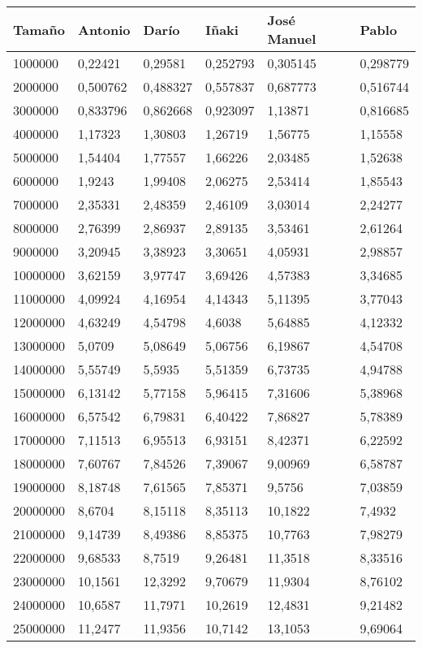 \begin{tabular}{|l|l|l|l|l|l|}
	\hline
	Tamaño & Antonio & Darío & Iñaki & José Manuel & Pablo \\
	\hline
	\hline
	1000000 & 0,22421 & 0,29581 & 0,252793 & 0,305145 & 0,298779 \\
	\hline
	2000000 & 0,500762 & 0,488327 & 0,557837 & 0,687773 & 0,516744 \\
	\hline
	3000000 & 0,833796 & 0,862668 & 0,923097 & 1,13871 & 0,816685 \\
	\hline
	4000000 & 1,17323 & 1,30803 & 1,26719 & 1,56775 & 1,15558 \\
	\hline
	5000000 & 1,54404 & 1,77557 & 1,66226 & 2,03485 & 1,52638 \\
	\hline
	6000000 & 1,9243 & 1,99408 & 2,06275 & 2,53414 & 1,85543 \\
	\hline
	7000000 & 2,35331 & 2,48359 & 2,46109 & 3,03014 & 2,24277 \\
	\hline
	8000000 & 2,76399 & 2,86937 & 2,89135 & 3,53461 & 2,61264 \\
	\hline
	9000000 & 3,20945 & 3,38923 & 3,30651 & 4,05931 & 2,98857 \\
	\hline
	10000000 & 3,62159 & 3,97747 & 3,69426 & 4,57383 & 3,34685 \\
	\hline
	11000000 & 4,09924 & 4,16954 & 4,14343 & 5,11395 & 3,77043 \\
	\hline
	12000000 & 4,63249 & 4,54798 & 4,6038 & 5,64885 & 4,12332 \\
	\hline
	13000000 & 5,0709 & 5,08649 & 5,06756 & 6,19867 & 4,54708 \\
	\hline
	14000000 & 5,55749 & 5,5935 & 5,51359 & 6,73735 & 4,94788 \\
	\hline
	15000000 & 6,13142 & 5,77158 & 5,96415 & 7,31606 & 5,38968 \\
	\hline
	16000000 & 6,57542 & 6,79831 & 6,40422 & 7,86827 & 5,78389 \\
	\hline
	17000000 & 7,11513 & 6,95513 & 6,93151 & 8,42371 & 6,22592 \\
	\hline
	18000000 & 7,60767 & 7,84526 & 7,39067 & 9,00969 & 6,58787 \\
	\hline
	19000000 & 8,18748 & 7,61565 & 7,85371 & 9,5756 & 7,03859 \\
	\hline
	20000000 & 8,6704 & 8,15118 & 8,35113 & 10,1822 & 7,4932 \\
	\hline
	21000000 & 9,14739 & 8,49386 & 8,85375 & 10,7763 & 7,98279 \\
	\hline
	22000000 & 9,68533 & 8,7519 & 9,26481 & 11,3518 & 8,33516 \\
	\hline
	23000000 & 10,1561 & 12,3292 & 9,70679 & 11,9304 & 8,76102 \\
	\hline
	24000000 & 10,6587 & 11,7971 & 10,2619 & 12,4831 & 9,21482 \\
	\hline
	25000000 & 11,2477 & 11,9356 & 10,7142 & 13,1053 & 9,69064 \\
	\hline
\end{tabular}

